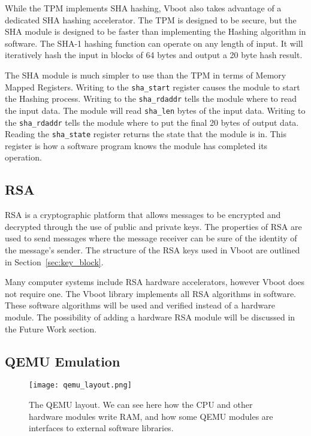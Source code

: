 \documentclass[../report.tex]{subfiles}
\def\code#1{\texttt{#1}}
\begin{document}
While the TPM implements SHA hashing, Vboot also takes advantage of a dedicated
SHA hashing accelerator. 
The TPM is designed to be secure, but the SHA module is designed to be faster
than implementing the Hashing algorithm in software.
The SHA-1 hashing function can operate on any length of input.
It will iteratively hash the input in blocks of 64 bytes and output a 20 byte
hash result.


The SHA module is much simpler to use than the TPM in terms of Memory Mapped
Registers. 
Writing to the  \code{sha\_start} register causes the module to start the
Hashing process.
Writing to the \code{sha\_rdaddr} tells the module where to read the input data.
The module will read \code{sha\_len} bytes of the input data.
Writing to the \code{sha\_rdaddr} tells the module where to put the final 20
bytes of output data.
Reading the \code{sha\_state} register returns the state that the module is in.
This register is how a software program knows the module has completed its
operation.

\subsection{RSA}

RSA is a cryptographic platform that allows messages to be encrypted and
decrypted through the use of public and private keys.
The properties of RSA are used to send messages where the message receiver can
be sure of the identity of the message's sender. 
The structure of the RSA keys used in Vboot are outlined in
Section~\ref{sec:key_block}.

Many computer systems include RSA hardware accelerators, however Vboot does not
require one. 
The Vboot library implements all RSA algorithms in software.
These software algorithms will be used and verified instead of a hardware
module.
The possibility of adding a hardware RSA module will be discussed in the Future
Work section.

\subsection{QEMU Emulation}\label{qemu_em}

\begin{figure}
  \centering
  \texttt{[image: qemu\_layout.png]}
  \caption{The QEMU layout. We can see here how the CPU and other hardware modules write RAM, and how some QEMU modules are interfaces to external software libraries.}
  \label{fig:qemu_layout}
\end{figure}
\end{document}
